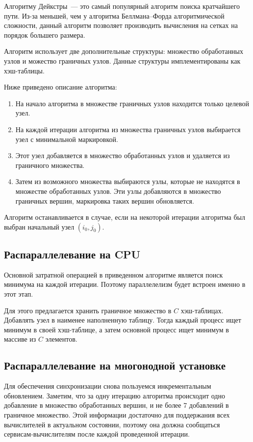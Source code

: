 Алгоритму Дейкстры~--- это самый популярный алгоритм поиска кратчайшего пути. Из-за меньшей, чем у алгоритма Беллмана--Форда алгоритмической сложности, данный алгоритм позволяет производить вычисления на сетках на порядок большего размера. 

Алгоритм использует две дополнительные структуры: множество обработанных узлов и можество граничных узлов. Данные структуры имплементированы как хэш-таблицы.

Ниже приведено описание алгоритма:
\begin{enumerate}
    \item На начало алгоритма в множестве граничных узлов находится только целевой узел. 
    \item На каждой итерации алгоритма из множества граничных узлов выбирается узел с минимальной маркировкой.
    \item Этот узел добавляется в множество обработанных узлов и удаляется из граничного множества.
    \item Затем из возможного множества выбираются узлы, которые не находятся в множестве обработанных узлов. Эти узлы добавляются в множество граничных вершин, маркировка таких вершин обновляется.
\end{enumerate}
Алгоритм останавливается в случае, если на некоторой итерации алгоритма был выбран начальный узел $(i_0,j_0)$.

\subsection{Распараллелевание на CPU}

Основной затратной операцией в приведенном алгоритме является поиск минимума на каждой итерации.
Поэтому параллелелизм будет встроен именно в этот этап.

Для этого предлагается хранить граничное множество в $C$ хэш-таблицах.
Добавлять узел в наименее наполненную таблицу.
Тогда каждый процесс ищет минимум в своей хэш-таблице, а затем основной процесс ищет минимум в массиве из $C$ элементов.

\subsection{Распараллелевание на многонодной установке}

Для обеспечения синхронизации снова пользуемся инкрементальным обновлением.
Заметим, что за одну итерацию алгоритма происходит одно добавление в множество обработанных вершин, и не более 7 добавлений в граничное множество.
Этой информации достаточно для поддержания всех вычислителей в актуальном состоянии, поэтому она должна сообщаться сервисам-вычислителям после каждой проведенной итерации.